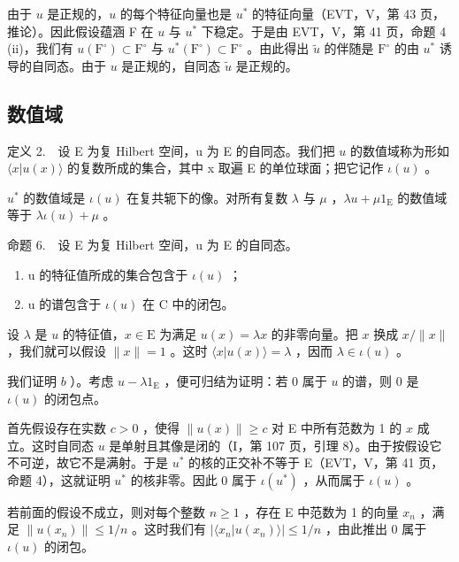 由于 \(u\) 是正规的，\(u\) 的每个特征向量也是 \(u^{*}\) 的特征向量（EVT，V，第 43 页，推论）。因此假设蕴涵 F 在 \(u\) 与 \(u^{*}\) 下稳定。于是由 EVT，V，第 41 页，命题 4 (ii)，我们有 \(u(\mathrm{F}^{\circ}) \subset \mathrm{F}^{\circ}\) 与 \(u^{*}(\mathrm{F}^{\circ}) \subset \mathrm{F}^{\circ}\) 。由此得出 \(\widetilde{u}\) 的伴随是 \(\mathrm{F}^{\circ}\) 的由 \(u^{*}\) 诱导的自同态。由于 \(u\) 是正规的，自同态 \(\widetilde{u}\) 是正规的。

\subsection{数值域}

定义 2.　设 E 为复 Hilbert 空间，u 为 E 的自同态。我们把 \(u\) 的数值域称为形如 \(\langle x|u(x)\rangle\) 的复数所成的集合，其中 x 取遍 E 的单位球面；把它记作 \(\iota(u)\) 。

\(u^{*}\) 的数值域是 \(\iota(u)\) 在复共轭下的像。对所有复数 \(\lambda\) 与 \(\mu\) ，\(\lambda u + \mu 1_{\mathrm{E}}\) 的数值域等于 \(\lambda \iota(u) + \mu\) 。

命题 6.　设 E 为复 Hilbert 空间，u 为 E 的自同态。

\begin{enumerate}
\def\labelenumi{\alph{enumi})}
\item
  u 的特征值所成的集合包含于 \(\iota(u)\) ；
\item
  u 的谱包含于 \(\iota(u)\) 在 C 中的闭包。
\end{enumerate}

设 \(\lambda\) 是 \(u\) 的特征值，\(x \in \mathrm{E}\) 为满足 \(u(x) = \lambda x\) 的非零向量。把 \(x\) 换成 \(x / \| x\|\) ，我们就可以假设 \(\| x \| = 1\) 。这时 \(\langle x | u(x) \rangle = \lambda\) ，因而 \(\lambda \in \iota(u)\) 。

我们证明 \(b\) ）。考虑 \(u - \lambda 1_{\mathrm{E}}\) ，便可归结为证明：若 0 属于 \(u\) 的谱，则 0 是 \(\iota(u)\) 的闭包点。

首先假设存在实数 \(c > 0\) ，使得 \(\| u(x)\| \geqslant c\) 对 E 中所有范数为 1 的 \(x\) 成立。这时自同态 \(u\) 是单射且其像是闭的（I，第 107 页，引理 8）。由于按假设它不可逆，故它不是满射。于是 \(u^{*}\) 的核的正交补不等于 E（EVT，V，第 41 页，命题 4），这就证明 \(u^{*}\) 的核非零。因此 0 属于 \(\iota(u^{*})\) ，从而属于 \(\iota(u)\) 。

若前面的假设不成立，则对每个整数 \(n \geqslant 1\) ，存在 E 中范数为 1 的向量 \(x_{n}\) ，满足 \(\|u(x_{n})\| \leqslant 1/n\) 。这时我们有 \(|\langle x_{n}|u(x_{n})\rangle| \leqslant 1/n\) ，由此推出 0 属于 \(\iota(u)\) 的闭包。

